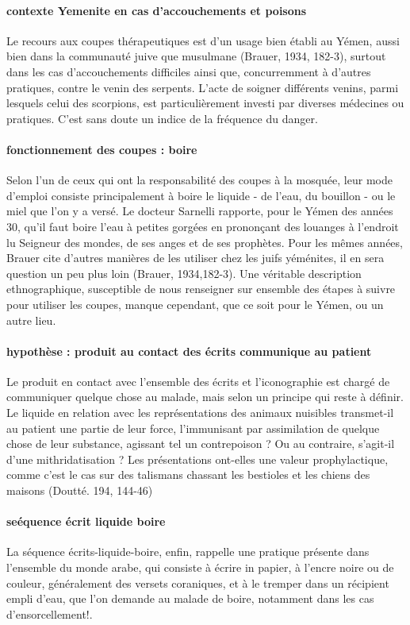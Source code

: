 \paragraph{contexte Yemenite en cas d'accouchements et poisons}
Le recours aux coupes thérapeutiques est d'un usage bien établi au
Yémen, aussi bien dans la communauté juive que musulmane (Brauer, 1934, 182-3), surtout dans les cas d'accouchements difficiles ainsi que, concurremment à d'autres pratiques, contre le venin des serpents. L'acte de soigner différents venins, parmi lesquels celui des scorpions, est particulièrement investi par diverses médecines ou pratiques. C'est sans doute un indice de la fréquence du danger. 
\paragraph{fonctionnement des coupes : boire}
Selon l'un de ceux qui ont la responsabilité des coupes à la mosquée, leur mode d'emploi consiste principalement à boire le liquide - de l'eau, du bouillon - ou le miel que l'on y a versé. Le docteur Sarnelli rapporte, pour le Yémen des années 30, qu'il faut boire l'eau à petites gorgées en prononçant des louanges à l'endroit lu Seigneur des mondes, de ses anges et de ses prophètes. Pour les mêmes années, Brauer cite d'autres manières de les utiliser chez les juifs yéménites, il en sera question un peu plus loin (Brauer, 1934,182-3). Une véritable description ethnographique, susceptible de nous renseigner sur ensemble des étapes à suivre pour utiliser les coupes, manque cependant, que ce soit pour le Yémen, ou un autre lieu.
\paragraph{hypothèse : produit au contact des écrits communique au patient}
Le produit en contact avec l'ensemble des écrits et l'iconographie est chargé de communiquer quelque chose au malade, mais selon un principe qui reste à définir. Le liquide en relation avec les représentations des animaux nuisibles transmet-il au patient une partie de leur force, l'immunisant par assimilation de quelque chose de leur substance, agissant tel un contrepoison ? Ou au contraire, s'agit-il d'une mithridatisation ? Les présentations ont-elles une valeur prophylactique, comme c'est le cas sur des talismans chassant les bestioles et les chiens des maisons (Doutté.
194, 144-46) 
\paragraph{seéquence écrit liquide boire}
  La séquence écrits-liquide-boire, enfin, rappelle une pratique présente dans l'ensemble du monde arabe, qui consiste à écrire in papier, à l'encre noire ou de couleur, généralement des versets coraniques, et à le tremper dans un récipient empli d'eau, que l'on demande au malade de boire, notamment dans les cas d'ensorcellement!.

